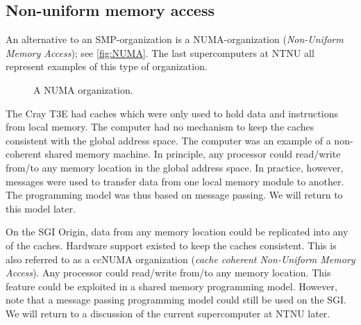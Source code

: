 \subsection{Non-uniform memory access}

An alternative to an SMP-organization is a NUMA-organization (\emph{Non-Uniform
Memory Access}); see \autoref{fig:NUMA}. The last supercomputers at NTNU all
represent examples of this type of organization.

\begin{figure}
  \centering
  \caption{A NUMA organization.}
  \label{fig:NUMA}
\end{figure}

The Cray T3E had caches which were only used to hold data and instructions from
local memory. The computer had no mechanism to keep the caches consistent with
the global address space. The computer was an example of a non-coherent shared
memory machine. In principle, any processor could read/write from/to any memory
location in the global address space. In practice, however, messages were used
to transfer data from one local memory module to another. The programming model
was thus based on message passing. We will return to this model later.

On the SGI Origin, data from any memory location could be replicated into any of
the caches. Hardware support existed to keep the caches consistent. This is also
referred to as a ccNUMA organization (\emph{cache coherent Non-Uniform Memory
Access}). Any processor could read/write from/to any memory location. This
feature could be exploited in a shared memory programming model. However, note
that a message passing programming model could still be used on the SGI. We will
return to a discussion of the current supercomputer at NTNU later.

